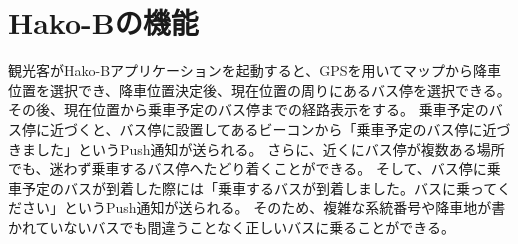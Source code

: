 \documentclass[openany,11pt,papersize]{jsbook}
\begin{document}
\section{Hako-Bの機能}
観光客がHako-Bアプリケーションを起動すると、GPSを用いてマップから降車位置を選択でき、降車位置決定後、現在位置の周りにあるバス停を選択できる。
その後、現在位置から乗車予定のバス停までの経路表示をする。
乗車予定のバス停に近づくと、バス停に設置してあるビーコンから「乗車予定のバス停に近づきました」というPush通知が送られる。
さらに、近くにバス停が複数ある場所でも、迷わず乗車するバス停へたどり着くことができる。
そして、バス停に乗車予定のバスが到着した際には「乗車するバスが到着しました。バスに乗ってください」というPush通知が送られる。
そのため、複雑な系統番号や降車地が書かれていないバスでも間違うことなく正しいバスに乗ることができる。

\end{document}
